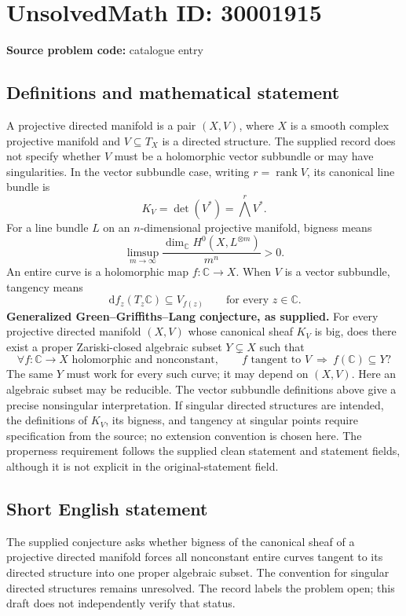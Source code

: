 \documentclass[11pt]{article}
\newcommand{\C}{\mathbb{C}}
\newcommand{\dd}{\,\mathrm{d}}
\begin{document}
\section*{UnsolvedMath ID: 30001915}
\textbf{Source problem code:} catalogue entry
\subsection{Definitions and mathematical statement}
A projective directed manifold is a pair \((X,V)\), where \(X\) is a smooth complex projective manifold and \(V\subseteq T_X\) is a directed structure. The supplied record does not specify whether \(V\) must be a holomorphic vector subbundle or may have singularities. In the vector subbundle case, writing \(r=\operatorname{rank}V\), its canonical line bundle is
\[
K_V=\det(V^*)=\bigwedge^r V^*.
\]
For a line bundle \(L\) on an \(n\)-dimensional projective manifold, bigness means
\[
\limsup_{m\to\infty}\frac{\dim_{\C}H^0(X,L^{\otimes m})}{m^n}>0.
\]
An entire curve is a holomorphic map \(f\colon\C\to X\). When \(V\) is a vector subbundle, tangency means
\[
\dd f_z(T_z\C)\subseteq V_{f(z)}\qquad\text{for every }z\in\C.
\]
\textbf{Generalized Green--Griffiths--Lang conjecture, as supplied.} For every projective directed manifold \((X,V)\) whose canonical sheaf \(K_V\) is big, does there exist a proper Zariski-closed algebraic subset \(Y\subsetneq X\) such that
\[
\forall f\colon\C\to X\text{ holomorphic and nonconstant},\qquad
f\text{ tangent to }V\ \Longrightarrow\ f(\C)\subseteq Y?
\]
The same \(Y\) must work for every such curve; it may depend on \((X,V)\). Here an algebraic subset may be reducible. The vector subbundle definitions above give a precise nonsingular interpretation. If singular directed structures are intended, the definitions of \(K_V\), its bigness, and tangency at singular points require specification from the source; no extension convention is chosen here. The properness requirement follows the supplied clean statement and statement fields, although it is not explicit in the original-statement field.
\subsection{Short English statement}
The supplied conjecture asks whether bigness of the canonical sheaf of a projective directed manifold forces all nonconstant entire curves tangent to its directed structure into one proper algebraic subset. The convention for singular directed structures remains unresolved. The record labels the problem open; this draft does not independently verify that status.
\end{document}
